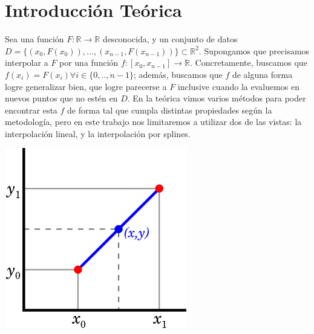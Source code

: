 \documentclass{article}
\begin{document}
{} %

\grupo{     
\\
}
 
\maketitle

\pagebreak

\section{Introducción Teórica}

Sea una función $F: \mathbb{R} \to \mathbb{R}$ desconocida, y un conjunto de datos $D = \{(x_0, F(x_0)), ..., (x_{n-1}, F(x_{n-1}))\} \subset \mathbb{R}^2$. Supongamos que precisamos interpolar a $F$ por una función $f: [x_0, x_{n-1}] \to \mathbb{R}$. Concretamente, buscamos que $f(x_i) = F(x_i) \forall i \in \{0, .., n-1\}$; además, buscamos que $f$ de alguna forma logre generalizar bien, que logre parecerse a $F$ inclusive cuando la evaluemos en nuevos puntos que no estén en $D$. En la teórica vimos varios métodos para poder encontrar esta $f$ de forma tal que cumpla distintas propiedades según la metodología, pero en este trabajo nos limitaremos a utilizar dos de las vistas: la interpolación lineal, y la interpolación por splines.

\includegraphics{LinearInterpolation.png}
\end{document}
